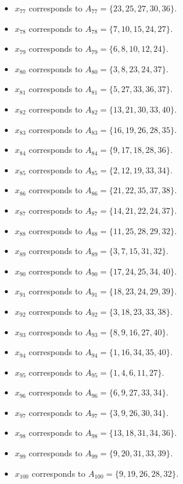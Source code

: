 \documentclass[11pt]{article}
\begin{document}
\begin{itemize}
\item $x_{77}$ corresponds to $A_{77}=\{23, 25, 27, 30, 36\}$.
\item $x_{78}$ corresponds to $A_{78}=\{7, 10, 15, 24, 27\}$.
\item $x_{79}$ corresponds to $A_{79}=\{6, 8, 10, 12, 24\}$.
\item $x_{80}$ corresponds to $A_{80}=\{3, 8, 23, 24, 37\}$.
\item $x_{81}$ corresponds to $A_{81}=\{5, 27, 33, 36, 37\}$.
\item $x_{82}$ corresponds to $A_{82}=\{13, 21, 30, 33, 40\}$.
\item $x_{83}$ corresponds to $A_{83}=\{16, 19, 26, 28, 35\}$.
\item $x_{84}$ corresponds to $A_{84}=\{9, 17, 18, 28, 36\}$.
\item $x_{85}$ corresponds to $A_{85}=\{2, 12, 19, 33, 34\}$.
\item $x_{86}$ corresponds to $A_{86}=\{21, 22, 35, 37, 38\}$.
\item $x_{87}$ corresponds to $A_{87}=\{14, 21, 22, 24, 37\}$.
\item $x_{88}$ corresponds to $A_{88}=\{11, 25, 28, 29, 32\}$.
\item $x_{89}$ corresponds to $A_{89}=\{3, 7, 15, 31, 32\}$.
\item $x_{90}$ corresponds to $A_{90}=\{17, 24, 25, 34, 40\}$.
\item $x_{91}$ corresponds to $A_{91}=\{18, 23, 24, 29, 39\}$.
\item $x_{92}$ corresponds to $A_{92}=\{3, 18, 23, 33, 38\}$.
\item $x_{93}$ corresponds to $A_{93}=\{8, 9, 16, 27, 40\}$.
\item $x_{94}$ corresponds to $A_{94}=\{1, 16, 34, 35, 40\}$.
\item $x_{95}$ corresponds to $A_{95}=\{1, 4, 6, 11, 27\}$.
\item $x_{96}$ corresponds to $A_{96}=\{6, 9, 27, 33, 34\}$.
\item $x_{97}$ corresponds to $A_{97}=\{3, 9, 26, 30, 34\}$.
\item $x_{98}$ corresponds to $A_{98}=\{13, 18, 31, 34, 36\}$.
\item $x_{99}$ corresponds to $A_{99}=\{9, 20, 31, 33, 39\}$.
\item $x_{100}$ corresponds to $A_{100}=\{9, 19, 26, 28, 32\}$.
\end{itemize}
\end{document}
